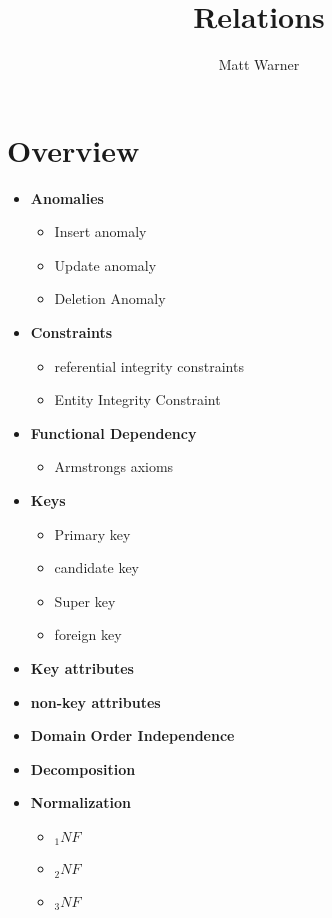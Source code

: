 \documentclass{report}
\title{\Huge{Relations}}
\author{\huge{Matt Warner}}
\date{\huge{}}
\begin{document}
    \maketitle
    \tableofcontents
    \newpage
    \section*{Overview}
    \begin{itemize}
        \item \textbf{Anomalies}
            \begin{itemize}[label=$\circ$]
                \item Insert anomaly
                \item Update anomaly
                \item Deletion Anomaly
            \end{itemize}
        \item \textbf{Constraints}
            \begin{itemize}[label=$\circ$]
        \item referential integrity constraints
        \item Entity Integrity Constraint
            \end{itemize}
        \item \textbf{Functional Dependency}
            \begin{itemize}[label=$\circ$]
                \item Armstrongs axioms
            \end{itemize}
        \item \textbf{Keys}
            \begin{itemize}[label=$\circ$]
                \item Primary key
                \item candidate key
                \item Super key
                \item foreign key
            \end{itemize}
        \item \textbf{Key attributes}
        \item \textbf{non-key attributes} 
        \item \textbf{Domain}
            \textbf{Order Independence}
        \item \textbf{Decomposition}
        \item \textbf{Normalization}
            \begin{itemize}[label=$\circ$]
                \item   $_1NF$
                \item $_2NF$
                \item $_3NF$
            \end{itemize}
    \end{itemize}
\end{document}
